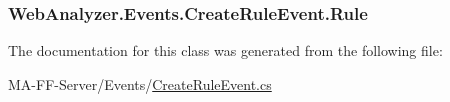 \subsubsection[{Rule}]{ Web\+Analyzer.\+Events.\+Create\+Rule\+Event.\+Rule\hspace{0.3cm}{\ttfamily [get]}}\label{class_web_analyzer_1_1_events_1_1_create_rule_event_a71f6a5e08aac9efa2b7da9052f8890e3}


The documentation for this class was generated from the following file\+:\begin{DoxyCompactItemize}
\item 
M\+A-\/\+F\+F-\/\+Server/\+Events/\hyperlink{_create_rule_event_8cs}{Create\+Rule\+Event.\+cs}\end{DoxyCompactItemize}
